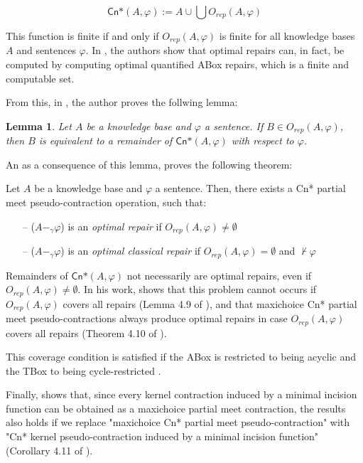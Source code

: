 $$\textsf{Cn*}(A, \varphi) := A \cup \bigcup O_{rep}(A, \varphi)$$

This function is finite if and only if $O_{rep}(A, \varphi)$ is finite for all knowledge bases $A$ and sentences $\varphi$. In \citet{Baader-ESWC2022}, the authors show that optimal repairs can, in fact, be computed by computing optimal quantified ABox repairs, which is a finite and computable set.

From this, in \citet{Baader-SAC23}, the author proves the follwing lemma:

\newtheorem{lemma}{Lemma}[chapter]

\begin{lemma}
    Let $A$ be a knowledge base and $\varphi$ a sentence. If $B \in O_{rep}(A, \varphi)$, then $B$ is equivalent to a remainder of $\textsf{Cn*}(A, \varphi)$ with respect to $\varphi$.
\end{lemma}

An as a consequence of this lemma, \citeauthor{Baader-SAC23} proves the following theorem:

\begin{theorem}
    Let $A$ be a knowledge base and $\varphi$ a sentence. Then, there exists a \textsf{Cn*} partial meet pseudo-contraction operation, such that:
    \begin{itemize}
        \item[--] ($A -_{\gamma} \varphi$) is an \textit{optimal repair} if $O_{rep}(A, \varphi) \neq \emptyset$
        \item[--] ($A -_{\gamma} \varphi$) is an \textit{optimal classical repair} if $O_{rep}(A, \varphi) = \emptyset$ and $\nvdash \varphi$
    \end{itemize}
\end{theorem}

Remainders of $\textsf{Cn*}(A, \varphi)$ not necessarily are optimal repairs, even if $O_{rep}(A, \varphi) \neq \emptyset$. In his work, \citeauthor{Baader-SAC23} shows that this problem cannot occurs if $O_{rep}(A, \varphi)$ covers all repairs (Lemma 4.9 of \citet{Baader-SAC23}), and that maxichoice \textsf{Cn*} partial meet pseudo-contractions always produce optimal repairs in case $O_{rep}(A, \varphi)$ covers all repairs (Theorem 4.10 of \citet{Baader-SAC23}).

This coverage condition is satisfied if the ABox is restricted to being acyclic and the TBox to being cycle-restricted \citep{Baader-ESWC2022,Baader-SAC23}.

Finally, \citeauthor{Baader-SAC23} shows that, since every kernel contraction induced by a minimal incision function can be obtained as a maxichoice partial meet contraction, the results also holds if we replace "maxichoice \textsf{Cn*} partial meet pseudo-contraction" with "\textsf{Cn*} kernel pseudo-contraction induced by a minimal incision function" (Corollary 4.11 of \citet{Baader-SAC23}).
